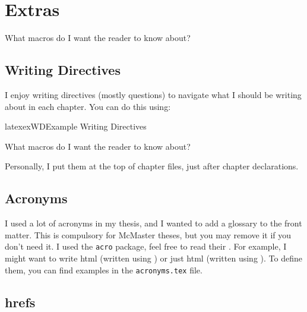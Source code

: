 \chapter{Extras}
\label{chap:extras}

\begin{writingdirectives}

    \item What macros do I want the reader to know about?

\end{writingdirectives}

\section{Writing Directives}
\label{chap:extras:sec:writing-directives}

I enjoy writing directives (mostly questions) to navigate what I should be
writing about in each chapter. You can do this using:

\begin{pseudocode}{latex}{exWD}{Example Writing Directives}
    \begin{writingdirectives}
        \item What macros do I want the reader to know about?
    \end{writingdirectives}
\end{pseudocode}

Personally, I put them at the top of chapter files, just after chapter
declarations.

\section{Acronyms}
\label{chap:extras:sec:acronyms}

I used a lot of acronyms in my thesis, and I wanted to add a glossary to the
front matter. This is compulsory for McMaster theses, but you may remove it if
you don't need it. I used the \texttt{acro} package, feel free to read their
. For example, I
might want to write \acf{html} (written using ) or
just \acs{html} (written using ). To define them,
you can find examples in the \texttt{acronyms.tex} file.

\section{\acsp{href}}
\label{chap:extras:sec:hrefs}

